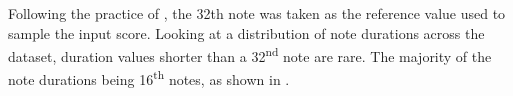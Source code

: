 
Following the practice of \textcite{micchi2020not}, the
\gls{32th} note was taken as the reference value used to
sample the input score. Looking at a distribution of note
durations across the dataset, duration values shorter than a
32\textsuperscript{nd} note are rare. The majority of the
note durations being 16\textsuperscript{th} notes, as shown
in .

